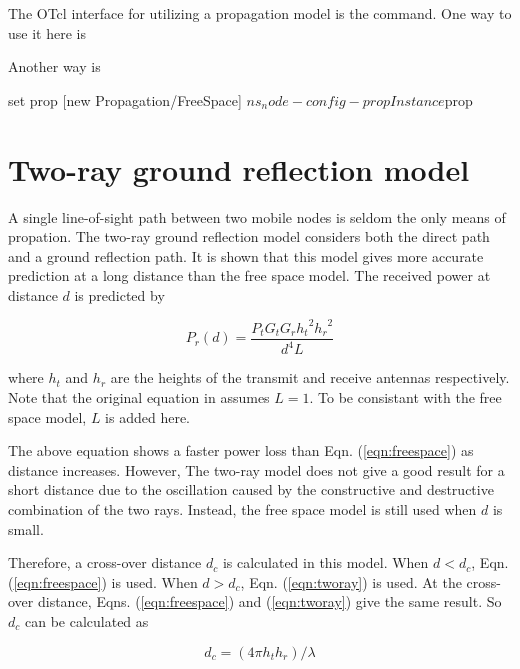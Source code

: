 The OTcl interface for utilizing a propagation model is the 
command. One way to use it here is


Another way is

\begin{program}
set prop [new Propagation/FreeSpace]
$ns_ node-config -propInstance $prop
\end{program}

\section{Two-ray ground reflection model}
\label{sec:tworay}

A single line-of-sight path between two mobile nodes is seldom the only means
of propation. The two-ray ground reflection model considers both the direct
path and a ground reflection path. It is shown \cite{Rappaport96} that this
model gives more accurate prediction at a long distance than the free space
model. The received power at distance $d$ is predicted by

\begin{equation}
  P_r (d) = \frac{P_t G_t G_r {h_t}^2 {h_r}^2}{d^4 L}
  \label{eqn:tworay}
\end{equation}

where $h_t$ and $h_r$ are the heights of the transmit and receive antennas
respectively. Note that the original equation in \cite{Rappaport96} assumes
$L = 1$. To be consistant with the free space model, $L$ is added here.

The above equation shows a faster power loss than Eqn. (\ref{eqn:freespace})
as distance increases. However, The two-ray model does not give a good result
for a short distance due to the oscillation caused by the constructive and
destructive combination of the two rays. Instead, the free space model is
still used when $d$ is small.

Therefore, a cross-over distance $d_c$ is calculated in this model. When
$d < d_c$, Eqn. (\ref{eqn:freespace}) is used. When $d > d_c$, Eqn.
(\ref{eqn:tworay}) is used. At the cross-over distance, Eqns. (\ref{eqn:freespace})
and (\ref{eqn:tworay}) give the same result. So $d_c$ can be calculated as

\begin{equation}
  d_c = \left( 4\pi h_t h_r \right) / \lambda
  \label{eqn:crossover}
\end{equation}

